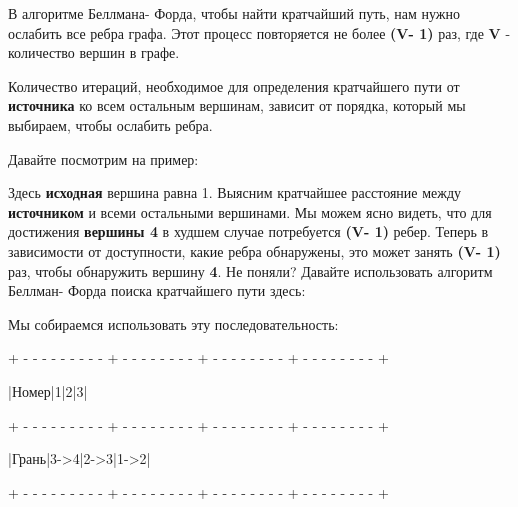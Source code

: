 \vspace{\baselineskip}

В алгоритме Беллмана- Форда, чтобы найти кратчайший путь, нам нужно ослабить все ребра графа. Этот процесс повторяется не более \textbf{(V- 1)} раз, где \textbf{V} -  количество вершин в графе.

\vspace{\baselineskip}

Количество итераций, необходимое для определения кратчайшего пути от \textbf{источника} ко всем остальным вершинам, зависит от порядка, который мы выбираем, чтобы ослабить ребра.

\vspace{\baselineskip}

Давайте посмотрим на пример:


Здесь \textbf{исходная} вершина равна 1. Выясним кратчайшее расстояние между \textbf{источником} и всеми остальными вершинами. Мы можем ясно видеть, что для достижения \textbf{вершины 4} в худшем случае потребуется \textbf{(V- 1)} ребер. Теперь в зависимости от доступности, какие ребра обнаружены, это может занять \textbf{(V- 1)} раз, чтобы обнаружить вершину \textbf{4}. Не поняли? Давайте использовать алгоритм Беллман- Форда поиска кратчайшего пути здесь:

\vspace{\baselineskip}

Мы собираемся использовать эту последовательность:

\begin{tcolorbox}
{\tiny+ -  -  -  -  -  -  -  -  -  + -  -  -  -  -  -  -  -  + -  -  -  -  -  -  -  -  + -  -  -  -  -  -  -  -  +}

\hspace{0.4mm}|\hspace{2.7mm}Номер\hspace{2.7mm}|\hspace{6.82mm}1\hspace{6.82mm}|\hspace{6.82mm}2\hspace{6.82mm}|\hspace{6.82mm}3\hspace{6.82mm}|

{\tiny+ - - - - - - - - - + - - - - - - - - + - - - - - - - - + - - - - - - - - +}

\hspace{0.4mm}|\hspace{3mm}Грань\hspace{3mm}|\hspace{3.55mm}3->4\hspace{3.55mm}|\hspace{3.55mm}2->3\hspace{3.55mm}|\hspace{3.55mm}1->2\hspace{3.55mm}|

{\tiny+ - - - - - - - - - + - - - - - - - - + - - - - - - - - + - - - - - - - - +}
\end{tcolorbox}

